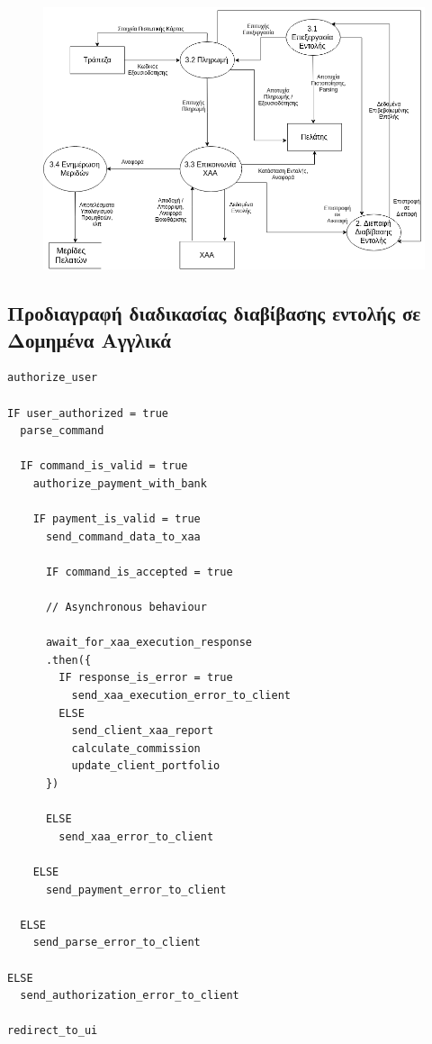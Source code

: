 \documentclass{article}
\begin{document}
	\begin{figure}[!h]
		\includegraphics[width=\linewidth]{../Structured_Analysis/Level_2_Diagram.png}
	\end{figure}

\newpage
\subsection{Προδιαγραφή διαδικασίας διαβίβασης εντολής σε Δομημένα Αγγλικά}
\begin{lstlisting}
authorize_user

IF user_authorized = true
  parse_command

  IF command_is_valid = true
    authorize_payment_with_bank

    IF payment_is_valid = true
      send_command_data_to_xaa

	  IF command_is_accepted = true

	  // Asynchronous behaviour

	  await_for_xaa_execution_response
	  .then({
		IF response_is_error = true
		  send_xaa_execution_error_to_client
		ELSE
		  send_client_xaa_report
		  calculate_commission
		  update_client_portfolio
	  })

	  ELSE
	    send_xaa_error_to_client

    ELSE
      send_payment_error_to_client

  ELSE
    send_parse_error_to_client

ELSE
  send_authorization_error_to_client

redirect_to_ui

\end{lstlisting}
\end{document}
